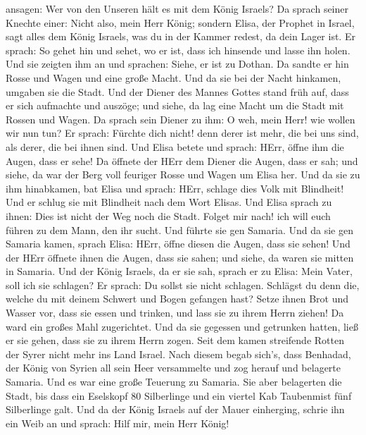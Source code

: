 ansagen: Wer von den Unseren hält es mit dem König Israels?
 Da sprach seiner Knechte einer: Nicht also, mein Herr
König; sondern Elisa, der Prophet in Israel, sagt alles dem König
Israels, was du in der Kammer redest, da dein Lager ist. 
Er sprach: So gehet hin und sehet, wo er ist, dass ich hinsende und
lasse ihn holen. Und sie zeigten ihm an und sprachen: Siehe, er ist zu
Dothan.  Da sandte er hin Rosse und Wagen und eine große
Macht. Und da sie bei der Nacht hinkamen, umgaben sie die Stadt.
 Und der Diener des Mannes Gottes stand früh auf, dass er
sich aufmachte und auszöge; und siehe, da lag eine Macht um die Stadt
mit Rossen und Wagen. Da sprach sein Diener zu ihm: O weh, mein Herr!
wie wollen wir nun tun?  Er sprach: Fürchte dich nicht!
denn derer ist mehr, die bei uns sind, als derer, die bei ihnen sind.
 Und Elisa betete und sprach: HErr, öffne ihm die Augen,
dass er sehe! Da öffnete der HErr dem Diener die Augen, dass er sah; und
siehe, da war der Berg voll feuriger Rosse und Wagen um Elisa her.
 Und da sie zu ihm hinabkamen, bat Elisa und sprach: HErr,
schlage dies Volk mit Blindheit! Und er schlug sie mit Blindheit nach
dem Wort Elisas.  Und Elisa sprach zu ihnen: Dies ist nicht
der Weg noch die Stadt. Folget mir nach! ich will euch führen zu dem
Mann, den ihr sucht. Und führte sie gen Samaria.  Und da
sie gen Samaria kamen, sprach Elisa: HErr, öffne diesen die Augen, dass
sie sehen! Und der HErr öffnete ihnen die Augen, dass sie sahen; und
siehe, da waren sie mitten in Samaria.  Und der König
Israels, da er sie sah, sprach er zu Elisa: Mein Vater, soll ich sie
schlagen?  Er sprach: Du sollst sie nicht schlagen.
Schlägst du denn die, welche du mit deinem Schwert und Bogen gefangen
hast? Setze ihnen Brot und Wasser vor, dass sie essen und trinken, und
lass sie zu ihrem Herrn ziehen!  Da ward ein großes Mahl
zugerichtet. Und da sie gegessen und getrunken hatten, ließ er sie
gehen, dass sie zu ihrem Herrn zogen. Seit dem kamen streifende Rotten
der Syrer nicht mehr ins Land Israel.  Nach diesem begab
sich's, dass Benhadad, der König von Syrien all sein Heer versammelte
und zog herauf und belagerte Samaria.  Und es war eine
große Teuerung zu Samaria. Sie aber belagerten die Stadt, bis dass ein
Eselskopf 80 Silberlinge und ein viertel Kab Taubenmist fünf Silberlinge
galt.  Und da der König Israels auf der Mauer einherging,
schrie ihn ein Weib an und sprach: Hilf mir, mein Herr König!
